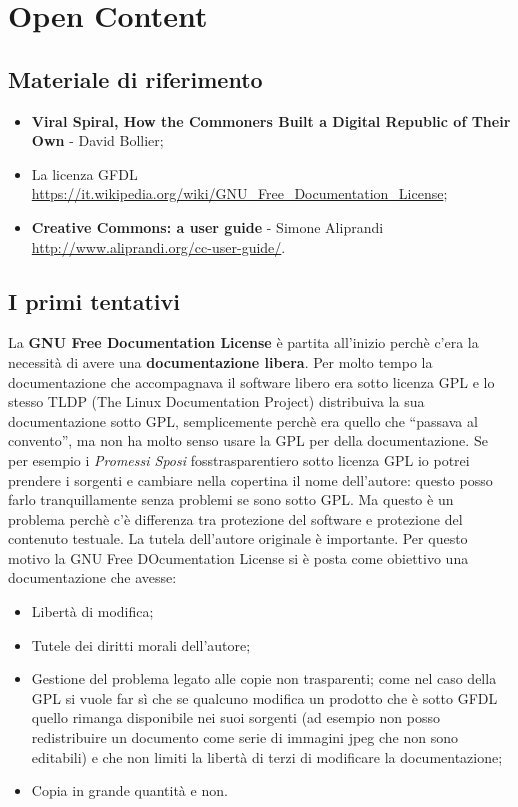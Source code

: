 \section{Open Content}

\subsection*{Materiale di riferimento}

\begin{itemize}

\item \textbf{Viral Spiral, How the Commoners Built a Digital Republic of Their Own} - David Bollier;
\item La licenza GFDL \url{https://it.wikipedia.org/wiki/GNU_Free_Documentation_License};
\item \textbf{Creative Commons: a user guide} - Simone Aliprandi \url{http://www.aliprandi.org/cc-user-guide/}.

\end{itemize}

\subsection{I primi tentativi}

La \textbf{GNU Free Documentation License} è partita all'inizio perchè c'era la necessità di avere una \textbf{documentazione libera}. Per molto tempo la documentazione che accompagnava il software libero era sotto licenza GPL e lo stesso TLDP (The Linux Documentation Project) distribuiva la sua documentazione sotto GPL, semplicemente perchè era quello che ``passava al convento'', ma non ha molto senso usare la GPL per della documentazione. Se per esempio i \textit{Promessi Sposi} fosstrasparentiero sotto licenza GPL io potrei prendere i sorgenti e cambiare nella copertina il nome dell'autore: questo posso farlo tranquillamente senza problemi se sono sotto GPL. Ma questo è un problema perchè c'è differenza tra protezione del software e protezione del contenuto testuale. La tutela dell'autore originale è importante. Per questo motivo la GNU Free DOcumentation License si è posta come obiettivo una documentazione che avesse:

\begin{itemize}

\item Libertà di modifica;
\item Tutele dei diritti morali dell'autore;
\item Gestione del problema legato alle copie non trasparenti; come nel caso della GPL si vuole far sì che se qualcuno modifica un prodotto che è sotto GFDL quello rimanga disponibile nei suoi sorgenti (ad esempio non posso redistribuire un documento come serie di immagini jpeg che non sono editabili) e che non limiti la libertà di terzi di modificare la documentazione;
\item Copia in grande quantità e non.

\end{itemize}

